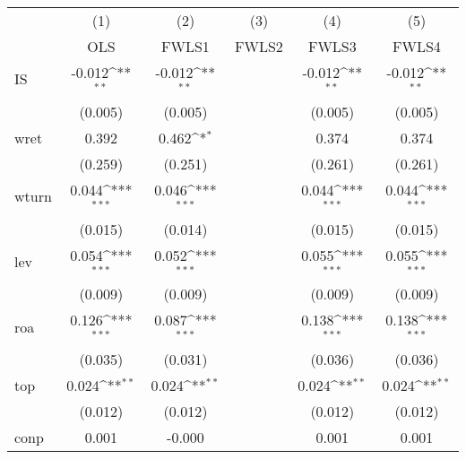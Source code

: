 {
\def\sym#1{\ifmmode^{#1}\else\(^{#1}\)\fi}
\begin{tabular}{l*{5}{c}}
\hline\hline
            &\multicolumn{1}{c}{(1)}&\multicolumn{1}{c}{(2)}&\multicolumn{1}{c}{(3)}&\multicolumn{1}{c}{(4)}&\multicolumn{1}{c}{(5)}\\
            &\multicolumn{1}{c}{OLS}&\multicolumn{1}{c}{FWLS1}&\multicolumn{1}{c}{FWLS2}&\multicolumn{1}{c}{FWLS3}&\multicolumn{1}{c}{FWLS4}\\
\hline
IS          &      -0.012\sym{**} &      -0.012\sym{**} &                     &      -0.012\sym{**} &      -0.012\sym{**} \\
            &     (0.005)         &     (0.005)         &                     &     (0.005)         &     (0.005)         \\
wret        &       0.392         &       0.462\sym{*}  &                     &       0.374         &       0.374         \\
            &     (0.259)         &     (0.251)         &                     &     (0.261)         &     (0.261)         \\
wturn       &       0.044\sym{***}&       0.046\sym{***}&                     &       0.044\sym{***}&       0.044\sym{***}\\
            &     (0.015)         &     (0.014)         &                     &     (0.015)         &     (0.015)         \\
lev         &       0.054\sym{***}&       0.052\sym{***}&                     &       0.055\sym{***}&       0.055\sym{***}\\
            &     (0.009)         &     (0.009)         &                     &     (0.009)         &     (0.009)         \\
roa         &       0.126\sym{***}&       0.087\sym{***}&                     &       0.138\sym{***}&       0.138\sym{***}\\
            &     (0.035)         &     (0.031)         &                     &     (0.036)         &     (0.036)         \\
top         &       0.024\sym{**} &       0.024\sym{**} &                     &       0.024\sym{**} &       0.024\sym{**} \\
            &     (0.012)         &     (0.012)         &                     &     (0.012)         &     (0.012)         \\
conp        &       0.001         &      -0.000         &                     &       0.001         &       0.001         \\

\end{tabular}}
